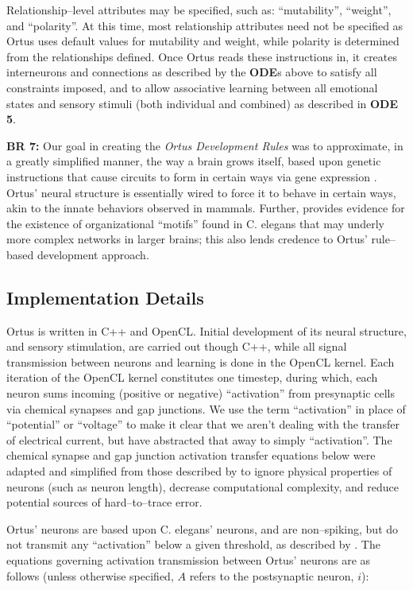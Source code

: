 \documentclass[letterpaper]{article}
\begin{document}
Relationship--level attributes may be specified, such as: ``mutability'', ``weight'', and ``polarity''. At this time, most relationship attributes need not be specified as Ortus uses default values for mutability and weight, while polarity is determined from the relationships defined. Once Ortus reads these instructions in, it creates interneurons and connections as described by the \textbf{ODE}s above to satisfy all constraints imposed, and to allow associative learning between all emotional states and sensory stimuli (both individual and combined) as described in \textbf{ODE 5}.


\textbf{BR 7:} Our goal in creating the \textit{Ortus Development Rules} was to approximate, in a greatly simplified manner, the way a brain grows itself, based upon genetic instructions that cause circuits to form in certain ways via gene expression \citep{Weiner2015}. Ortus' neural structure is essentially wired to force it to behave in certain ways, akin to the innate behaviors observed in mammals. Further, \citet{Schroter2017} provides evidence for the existence of organizational ``motifs'' found in C. elegans that may underly more complex networks in larger brains; this also lends credence to Ortus' rule--based development approach.


\subsection{Implementation Details} Ortus is written in C++ and OpenCL. Initial development of its neural structure, and sensory stimulation, are carried out though C++, while all signal transmission between neurons and learning is done in the OpenCL kernel. Each iteration of the OpenCL kernel constitutes one timestep, during which, each neuron sums incoming (positive or negative) ``activation'' from presynaptic cells via chemical synapses and gap junctions. We use the term ``activation'' in place of ``potential'' or ``voltage'' to make it clear that we aren't dealing with the transfer of electrical current, but have abstracted that away to simply ``activation''. The chemical synapse and gap junction activation transfer equations below were adapted and simplified from those described by \cite{Wicks1996} to ignore physical properties of neurons (such as neuron length), decrease computational complexity, and reduce potential sources of hard--to--trace error.

Ortus' neurons are based upon C. elegans' neurons, and are non--spiking, but do not transmit any ``activation'' below a given threshold, as described by \citet{Graubard1014}. The equations governing activation transmission between Ortus' neurons are as follows (unless otherwise specified, $A$ refers to the postsynaptic neuron, $i$):
\end{document}
